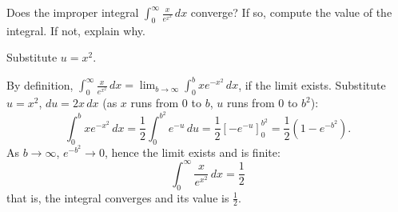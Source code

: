 
\begin{question}
Does the improper integral $\displaystyle\int_0^\infty\frac{x}{e^{x^2}}\,dx$ converge? If so, compute the value of the integral. If not, explain why.
\end{question}

\begin{hint}
Substitute $u=x^2$.
\end{hint}

\begin{solution}
By definition, $\int_0^\infty\frac{x}{e^{x^2}}\,dx=\lim_{b\to\infty}\int_0^b xe^{-x^2}\,dx$, if the limit exists. Substitute $u=x^2$, $du=2x\,dx$ (as $x$ runs from $0$ to $b$, $u$ runs from $0$ to $b^2$):
\[ \int_0^b xe^{-x^2}\,dx=\frac12\int_0^{b^2}e^{-u}\,du=\frac12\left[-e^{-u}\right]_0^{b^2}=\frac12\left(1-e^{-b^2}\right). \]
As $b\to\infty$, $e^{-b^2}\to0$, hence the limit exists and is finite:
\[ \boxed{\int_0^\infty\frac{x}{e^{x^2}}\,dx=\frac12} \]
that is, the integral converges and its value is $\frac12$.
\end{solution}
